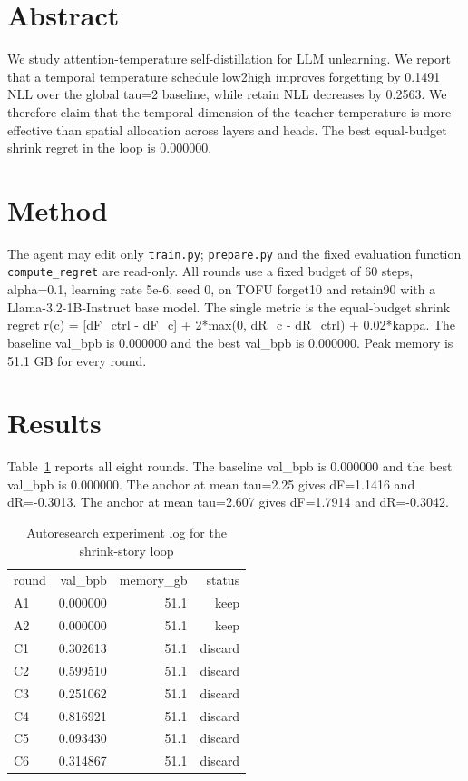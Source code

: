 \documentclass{article}
\begin{document}
\section{Abstract}
We study attention-temperature self-distillation for LLM unlearning.
We report that a temporal temperature schedule low2high improves forgetting by 0.1491 NLL
over the global tau=2 baseline, while retain NLL decreases by 0.2563.
We therefore claim that the temporal dimension of the teacher temperature is more effective
than spatial allocation across layers and heads.
The best equal-budget shrink regret in the loop is 0.000000.

\section{Method}
The agent may edit only \texttt{train.py}; \texttt{prepare.py} and the fixed evaluation
function \texttt{compute\_regret} are read-only.
All rounds use a fixed budget of 60 steps, alpha=0.1, learning rate 5e-6, seed 0,
on TOFU forget10 and retain90 with a Llama-3.2-1B-Instruct base model.
The single metric is the equal-budget shrink regret
r(c) = [dF\_ctrl - dF\_c] + 2*max(0, dR\_c - dR\_ctrl) + 0.02*kappa.
The baseline val\_bpb is 0.000000 and the best val\_bpb is 0.000000.
Peak memory is 51.1 GB for every round.

\section{Results}
Table~\ref{tab:main} reports all eight rounds.
The baseline val\_bpb is 0.000000 and the best val\_bpb is 0.000000.
The anchor at mean tau=2.25 gives dF=1.1416 and dR=-0.3013.
The anchor at mean tau=2.607 gives dF=1.7914 and dR=-0.3042.

\begin{table}[h]
\caption{Autoresearch experiment log for the shrink-story loop}
\label{tab:main}
\begin{tabular}{lrrr}
round & val\_bpb & memory\_gb & status \\
A1 & 0.000000 & 51.1 & keep \\
A2 & 0.000000 & 51.1 & keep \\
C1 & 0.302613 & 51.1 & discard \\
C2 & 0.599510 & 51.1 & discard \\
C3 & 0.251062 & 51.1 & discard \\
C4 & 0.816921 & 51.1 & discard \\
C5 & 0.093430 & 51.1 & discard \\
C6 & 0.314867 & 51.1 & discard \\
\end{tabular}
\end{table}
\end{document}
